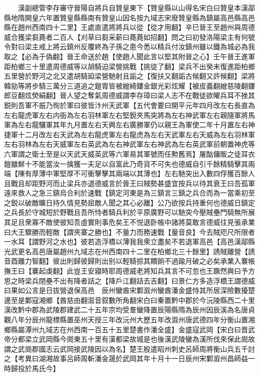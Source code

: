　　漢副總管李存審守晉陽自將兵自贊皇東下【贊皇縣以山得名宋白曰贊皇本漢鄗縣地隋開皇六年置贊皇縣縣南有贊皇山因名按九域志宋廢贊皇縣為鎮屬高邑縣高邑縣在趙州西南四十二里】王處直遣將將兵以從【從才用翻】辛巳晉王至趙州與周德威合獲梁芻蕘者二百人【刈草曰芻采薪曰蕘蕘如招翻】問之曰初發洛陽梁主有何號令對曰梁主戒上將云鎮州反覆終為子孫之患今悉以精兵付汝鎮州雖以鐵為城必為我取之【必為于偽翻】晉王命送於趙【使趙人聞此言以堅其附晉之心】壬午晉王進軍距柏鄉三十里遣周德威等以胡騎迫梁營挑戰【挑徒了翻】梁兵不出癸未復進距柏鄉五里營於野河之北又遣胡騎廹梁營馳射且詬之【復扶又翻詬古候翻又許候翻】梁將韓勍等將步騎三萬分三道追之鎧胄皆被繒綺鏤金銀光彩炫耀【被皮義翻繒慈陵翻鏤郎豆翻炫熒絹翻】晉人望之奪氣周德威謂李存璋曰梁人志不在戰徒欲曜兵耳不挫其鋭則吾軍不振乃徇於軍曰彼皆汴州天武軍【五代會要曰開平元年四月改左右長直為左右龍虎軍左右内衙為左右羽林軍左右堅銳夾馬突將為左右神武軍左右親隨軍將馬軍為左右龍驤軍其年九月置左右天興左右廣勝軍仍以親王為軍使二年十月置左右神捷軍十二月改左右天武為左右龍虎軍左右龍虎為左右天武軍左右天威為左右羽林軍左右羽林為左右天威軍左右英武為左右神武軍左右神武為左右英武軍前朝置神虎等六軍謂之衛士至是以天武天威英武等六軍易其軍號而任勲舊焉】屠酤傭販之徒耳衣鎧雖鮮十不能當汝一擒獲一夫足以自富此乃奇貨不可失也德威自引千餘精騎擊其兩端【陳有厚薄中軍堅厚不可衝擊擊其兩端以其薄也】左右馳突出入數四俘獲百餘人且戰且却距野河而止梁兵亦退德威言於晉王曰賊勢甚盛宜按兵以待其衰王曰吾孤軍遠來救人之急三鎮烏合利於速戰【鎮定河東是為三鎮言三鎮之兵合而為一當乘初至之鋭以破敵曠日持久情見勢屈敵人聞之其心必離】公乃欲按兵持重何也德威日鎮定之兵長於守城短於野戰且吾所恃者騎兵利於平原廣野可以馳突今壓賊壘門騎無所展其足且衆寡不敵使彼知吾虛實則事危矣王不悦退卧帳中諸將莫敢言德威往見張承業曰大王驟勝而輕敵【謂夾寨之勝也】不量力而務速戰【量音良】今去賊咫尺所限者一水耳【謂野河之水也】彼若造浮橋以薄我我衆立盡矣不若退軍高邑【高邑漢鄗縣光武更名高邑唐屬趙州九域志在州西南四十二里在柏鄉北三十餘里】誘賊離營【誘音酉離力智翻】彼出則歸彼歸則出别以輕騎掠其饋餉不過踰月破之必矣承業入褰帳撫王曰【褰起虔翻】此豈王安寢時耶周德威老將知兵其言不可忽也王蹶然興曰予方思之時梁兵閉壘不出有降者詰之【降戶江翻詰去吉翻】曰景仁方多造浮橋王謂德威曰果如公言是日拔營退保高邑　辰州蠻酋宋鄴溆州蠻酋潘金盛恃其所居深險數擾楚邊至是鄴寇湘鄉【酋慈由翻溆音叙數所角翻宋白曰秦置黔中郡於今沅陵縣西二十里漢改黔中郡為武陵郡建武二十五年宗均受羣蠻降置辰陽縣隋為辰州因辰溪為名唐貞觀八年分辰州龍標縣置巫州天授三年改沅州大歷五年改溆州唐武德四年分衡山置湘鄉縣屬潭州九域志在州西南一百五十五里楚書作潘全盛】金盛寇武岡【宋白曰晋武帝分都梁立武岡縣今崗東五十里有漢都梁故城是也後漢武陵蠻為漢所伐來保此崗故謂之武崗郡國志云武岡接武陵因以為名】楚王殷遣昭州刺史呂師周將衡山兵五千討之【考異曰湖湘故事呂師周斬潘金晟於武岡其年十月十一日辰州宋鄴溆州昌師益一時歸投於馬氏今】

